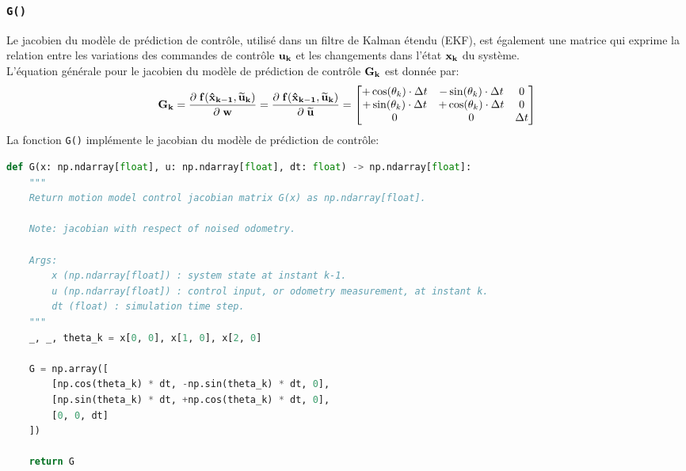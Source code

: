 \documentclass[../CSC_5RO12_TA_TP2.tex]{subfiles}
\begin{document}
\subsubsection{\texttt{G()}}
\begin{definition}
    Le jacobien du modèle de prédiction de contrôle, utilisé dans un filtre de Kalman étendu (EKF), est également une matrice qui exprime la relation entre les variations des commandes de contrôle $\bf{u}_{k}$ et les changements dans l'état $\bf{x}_{k}$ du système.\\

    \noindent L'équation générale pour le jacobien du modèle de prédiction de contrôle $\bf{G}_{k}$ est donnée par:
    \begin{equation}
        \bf{G}_{k} = \frac{\partial\;f(\hat{\bf{x}}_{k-1}, \widetilde{\bf{u}}_{k})}{\partial\;\bf{w}} = \frac{\partial\;f(\hat{\bf{x}}_{k-1}, \widetilde{\bf{u}}_{k})}{\partial\;\widetilde{\bf{u}}} = \begin{bmatrix}
            +\cos(\theta_{k}) \cdot \Delta t & -\sin(\theta_{k}) \cdot \Delta t & 0\\
            +\sin(\theta_{k}) \cdot \Delta t & +\cos(\theta_{k}) \cdot \Delta t & 0\\
            0 & 0 & \Delta t\\
        \end{bmatrix}
    \end{equation}
    La fonction \texttt{G()} implémente le jacobian du modèle de prédiction de contrôle:
    \begin{scriptsize}\mycode
        \begin{lstlisting}[language=Python, caption=\texttt{G()}]
def G(x: np.ndarray[float], u: np.ndarray[float], dt: float) -> np.ndarray[float]:
    """
    Return motion model control jacobian matrix G(x) as np.ndarray[float].

    Note: jacobian with respect of noised odometry.

    Args:
        x (np.ndarray[float]) : system state at instant k-1.
        u (np.ndarray[float]) : control input, or odometry measurement, at instant k.
        dt (float) : simulation time step.
    """
    _, _, theta_k = x[0, 0], x[1, 0], x[2, 0]

    G = np.array([
        [np.cos(theta_k) * dt, -np.sin(theta_k) * dt, 0],
        [np.sin(theta_k) * dt, +np.cos(theta_k) * dt, 0],
        [0, 0, dt]
    ])

    return G
        \end{lstlisting}
    \end{scriptsize}
\end{definition}
\end{document}
